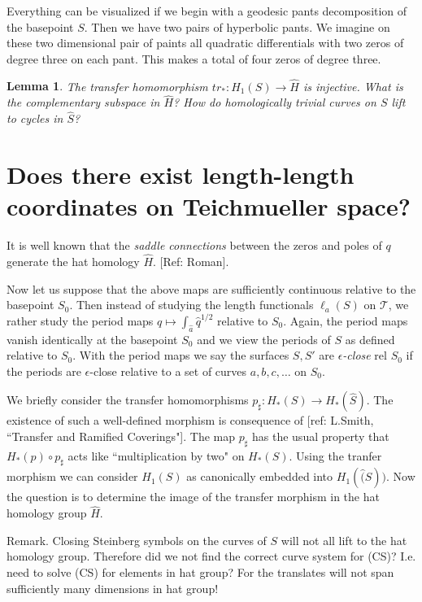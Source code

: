 \documentclass[12pt]{article}
\newtheorem{lem}[thm]{Lemma}
\theoremstyle{definition}
\theoremstyle{remark}
\newcommand{\sT}{\mathscr{T}}
\newcommand{\hS}{\hat{S}}
\begin{document}
Everything can be visualized if we begin with a geodesic pants decomposition of the basepoint $S$. Then we have two pairs of hyperbolic pants. We imagine on these two dimensional pair of paints all quadratic differentials with two zeros of degree three on each pant. This makes a total of four zeros of degree three. 

\begin{lem}
The transfer homomorphism $tr_*: H_1(S) \to \hat{H}$ is injective. What is the complementary subspace in $\hat{H}$? How do homologically trivial curves on $S$ lift to cycles in $\hS$? 
\end{lem}



\section{Does there exist length-length coordinates on Teichmueller space?}

It is well known that the \emph{saddle connections} between the zeros and poles of $q$ generate the hat homology $\hat{H}$. [Ref: Roman]. 

Now let us suppose that the above maps are sufficiently continuous relative to the basepoint $S_0$. Then instead of studying the length functionals $\ell_a(S)$ on $\sT$, we rather study the period maps $q\mapsto \int_{\hat{a}} \hat{q}^{1/2}$ relative to $S_0$. Again, the period maps vanish identically at the basepoint $S_0$ and we view the periods of $S$ as defined relative to $S_0$. With the period maps we say the surfaces $S, S'$ are \emph{$\epsilon$-close} rel $S_0$ if the periods are $\epsilon$-close relative to a set of curves $a,b,c, \ldots$ on $S_0$. 

We briefly consider the transfer homomorphisms $p_{\sharp}:H_*(S) \to H_*(\hat{S})$. The existence of such a well-defined morphism is consequence of [ref: L.Smith, ``Transfer and Ramified Coverings"].  The map $p_\sharp$ has the usual property that $H_*(p) \circ p_\sharp$ acts like ``multiplication by two" on $H_*(S)$. Using the tranfer morphism we can consider $H_1(S)$ as canonically embedded into $H_1(\hat(S))$. Now the question is to determine the image of the transfer morphism in the hat homology group $\hat{H}$.

Remark. Closing Steinberg symbols on the curves of $S$ will not all lift to the hat homology group. Therefore did we not find the correct curve system for (CS)? I.e. need to solve (CS) for elements in hat group? For the translates will not span sufficiently many dimensions in hat group! 
\end{document}
